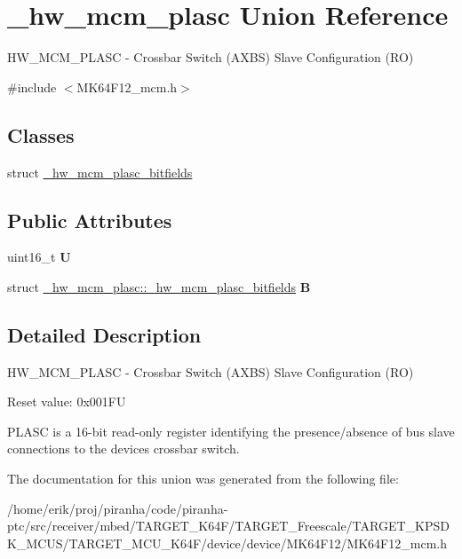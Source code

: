 \hypertarget{union__hw__mcm__plasc}{}\section{\+\_\+hw\+\_\+mcm\+\_\+plasc Union Reference}
\label{union__hw__mcm__plasc}


H\+W\+\_\+\+M\+C\+M\+\_\+\+P\+L\+A\+SC -\/ Crossbar Switch (A\+X\+BS) Slave Configuration (RO)  




{\ttfamily \#include $<$M\+K64\+F12\+\_\+mcm.\+h$>$}

\subsection*{Classes}
\begin{DoxyCompactItemize}
\item 
struct \hyperlink{struct__hw__mcm__plasc_1_1__hw__mcm__plasc__bitfields}{\+\_\+hw\+\_\+mcm\+\_\+plasc\+\_\+bitfields}
\end{DoxyCompactItemize}
\subsection*{Public Attributes}
\begin{DoxyCompactItemize}
\item 
uint16\+\_\+t {\bfseries U}\hypertarget{union__hw__mcm__plasc_abf46aae61e679b78856d98b219b1e5b0}{}\label{union__hw__mcm__plasc_abf46aae61e679b78856d98b219b1e5b0}

\item 
struct \hyperlink{struct__hw__mcm__plasc_1_1__hw__mcm__plasc__bitfields}{\+\_\+hw\+\_\+mcm\+\_\+plasc\+::\+\_\+hw\+\_\+mcm\+\_\+plasc\+\_\+bitfields} {\bfseries B}\hypertarget{union__hw__mcm__plasc_a1a797f1b33111e773b09f61e43052e95}{}\label{union__hw__mcm__plasc_a1a797f1b33111e773b09f61e43052e95}

\end{DoxyCompactItemize}


\subsection{Detailed Description}
H\+W\+\_\+\+M\+C\+M\+\_\+\+P\+L\+A\+SC -\/ Crossbar Switch (A\+X\+BS) Slave Configuration (RO) 

Reset value\+: 0x001\+FU

P\+L\+A\+SC is a 16-\/bit read-\/only register identifying the presence/absence of bus slave connections to the device\textquotesingle{}s crossbar switch. 

The documentation for this union was generated from the following file\+:\begin{DoxyCompactItemize}
\item 
/home/erik/proj/piranha/code/piranha-\/ptc/src/receiver/mbed/\+T\+A\+R\+G\+E\+T\+\_\+\+K64\+F/\+T\+A\+R\+G\+E\+T\+\_\+\+Freescale/\+T\+A\+R\+G\+E\+T\+\_\+\+K\+P\+S\+D\+K\+\_\+\+M\+C\+U\+S/\+T\+A\+R\+G\+E\+T\+\_\+\+M\+C\+U\+\_\+\+K64\+F/device/device/\+M\+K64\+F12/M\+K64\+F12\+\_\+mcm.\+h\end{DoxyCompactItemize}
